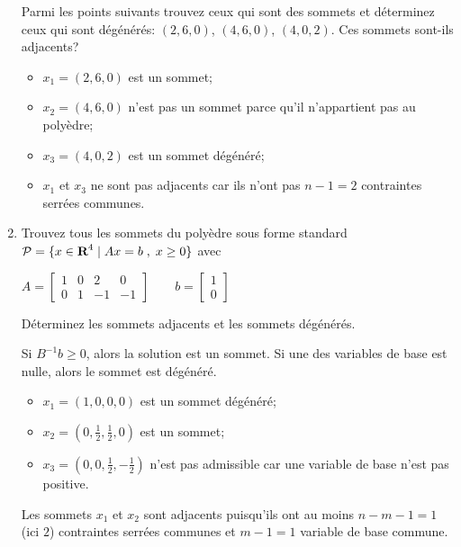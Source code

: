 \begin{enumerate}
    Parmi les points suivants trouvez ceux qui sont des sommets et déterminez ceux qui sont
    dégénérés: $(2, 6, 0)$, $(4, 6, 0)$, $(4, 0, 2)$. Ces sommets sont-ils adjacents?





    \begin{solution}
      \begin{itemize}
        \item $x_{1} = (2,6,0) $ est un sommet;
        \item $x_{2} = (4,6,0) $ n'est pas un sommet parce
          qu'il n'appartient pas au polyèdre;
        \item $x_{3} = (4,0,2) $ est un sommet dégénéré;
        \item $x_{1}$ et  $x_{3}$ ne sont pas adjacents
          car ils n'ont pas $n-1=2$ contraintes serrées communes.
      \end{itemize}
    \end{solution}

  \item Trouvez  tous les sommets du poly\`edre sous forme standard ${\mathcal{P}}=\{x \in {\mbox{\bf R}}^4 \; | \; Ax=b \; , \; x \geq 0\}$ avec

    $
    A=
    \left[ \begin{array}{rrrr}
        1 & 0 & 2 & 0\\
        0 & 1 & -1 & -1
      \end{array}
    \right]
    \qquad
    b=
    \left[ \begin{array}{r}
        1 \\
        0
      \end{array}
    \right]$


    Déterminez les sommets adjacents et les sommets dégénérés.


    \begin{solution}
      Si $B^{-1}b \geq 0$, alors la solution est un sommet.
      Si une des variables de base est nulle, alors le sommet est dégénéré.
      \begin{itemize}
        \item $x_{1} = (1,0,0,0)$ est un sommet dégénéré;
        \item $x_{2} = (0,\frac{1}{2},\frac{1}{2},0)$ est un sommet;
        \item $x_{3} = (0,0,\frac{1}{2},-\frac{1}{2})$ n'est pas admissible
          car une variable de base n'est pas positive.
      \end{itemize}
      Les sommets $x_{1}$ et $x_{2}$ sont adjacents puisqu'ils ont
      au moins $n-m-1 = 1$ (ici $2$) contraintes serrées communes
      et $m-1 = 1$ variable de base commune.
    \end{solution}


\end{enumerate}
